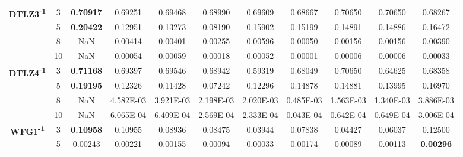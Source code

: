 \documentclass[conference]{IEEEtran}
\begin{document}
\begin{table*}[!htb]
\begin{tabular}{|c|c|c|c|c|c|c|c|c|c|c|}
	\multirow{4}{*}{\textbf{DTLZ3\textsuperscript{-1}}} & 3          & \textbf{0.70917} & 0.69251           & 0.69468               & 0.68990          & 0.69609             & 0.68667             & 0.70650            & 0.70650              & 0.68267          \\ \cline{2-11} 
	& 5          & \textbf{0.20422} & 0.12951           & 0.13273               & 0.08190          & 0.15902             & 0.15199             & 0.14891            & 0.14886              & 0.16472          \\ \cline{2-11} 
	& 8          & NaN              & 0.00414           & 0.00401               & 0.00255          & 0.00596             & 0.00050             & 0.00156            & 0.00156              & 0.00390          \\ \cline{2-11} 
	& 10         & NaN              & 0.00054           & 0.00059               & 0.00018          & 0.00052             & 0.00001             & 0.00006            & 0.00006              & 0.00033          \\ \hline
	\multirow{4}{*}{\textbf{DTLZ4\textsuperscript{-1}}} & 3          & \textbf{0.71168} & 0.69397           & 0.69546               & 0.68942          & 0.59319             & 0.68049             & 0.70650            & 0.64625              & 0.68358          \\ \cline{2-11} 
	& 5          & \textbf{0.19195} & 0.12326           & 0.11428               & 0.07242          & 0.12296             & 0.14878             & 0.14881            & 0.13995              & 0.16970          \\ \cline{2-11} 
	& 8          & NaN              & 4.582E-03         & 3.921E-03             & 2.198E-03        & 2.020E-03           & 0.485E-03           & 1.563E-03          & 1.340E-03            & 3.886E-03        \\ \cline{2-11} 
	& 10         & NaN              & 6.065E-04         & 6.409E-04             & 2.569E-04        & 2.333E-04           & 0.043E-04           & 0.642E-04          & 0.649E-04            & 3.006E-04        \\ \hline
	\multirow{4}{*}{\textbf{WFG1\textsuperscript{-1}}}  & 3          & \textbf{0.10958} & 0.10955           & 0.08936               & 0.08475          & 0.03944             & 0.07838             & 0.04427            & 0.06037              & 0.12500          \\ \cline{2-11} 
	& 5          & 0.00243          & 0.00221           & 0.00155               & 0.00094          & 0.00033             & 0.00174             & 0.00089            & 0.00113              & \textbf{0.00296} \\ \cline{2-11} 

\end{tabular}
\end{table*}
\end{document}
